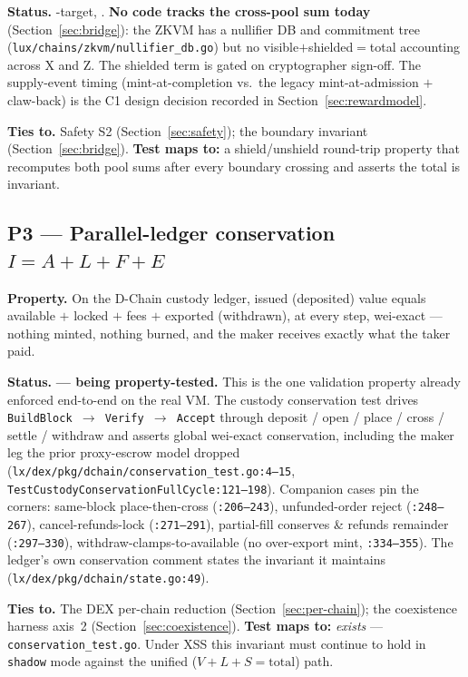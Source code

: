 \textbf{Status.} \DESIGN{}-target, \CRYPTO{}. \textbf{No code tracks the
cross-pool sum today} (Section~\ref{sec:bridge}): the ZKVM has a
nullifier DB and commitment tree
(\texttt{lux/chains/zkvm/nullifier\_db.go}) but no
visible$+$shielded$=$total accounting across X and Z. The shielded term
is gated on cryptographer sign-off. The supply-event timing
(mint-at-completion vs.\ the legacy mint-at-admission $+$ claw-back) is
the C1 design decision recorded in Section~\ref{sec:rewardmodel}.

\textbf{Ties to.} Safety S2 (Section~\ref{sec:safety}); the boundary
invariant (Section~\ref{sec:bridge}). \textbf{Test maps to:} a
shield/unshield round-trip property that recomputes both pool sums after
every boundary crossing and asserts the total is invariant.

\subsection*{P3 --- Parallel-ledger conservation $I = A + L + F + E$}

\textbf{Property.} On the D-Chain custody ledger, issued (deposited)
value equals available $+$ locked $+$ fees $+$ exported (withdrawn), at
every step, wei-exact --- nothing minted, nothing burned, and the maker
receives exactly what the taker paid.

\textbf{Status.} \IMPL{} \textbf{--- being property-tested.} This is the
one validation property already enforced end-to-end on the real VM. The
custody conservation test drives \texttt{BuildBlock $\to$ Verify $\to$
Accept} through deposit / open / place / cross / settle / withdraw and
asserts global wei-exact conservation, including the maker leg the prior
proxy-escrow model dropped
(\texttt{lx/dex/pkg/dchain/conservation\_test.go:4--15},
\texttt{TestCustodyConservationFullCycle:121--198}). Companion cases pin
the corners: same-block place-then-cross
(\texttt{:206--243}), unfunded-order reject (\texttt{:248--267}),
cancel-refunds-lock (\texttt{:271--291}), partial-fill conserves \&
refunds remainder (\texttt{:297--330}), withdraw-clamps-to-available
(no over-export mint, \texttt{:334--355}). The ledger's own conservation
comment states the invariant it maintains
(\texttt{lx/dex/pkg/dchain/state.go:49}).

\textbf{Ties to.} The DEX per-chain reduction (Section~\ref{sec:per-chain});
the coexistence harness axis~2 (Section~\ref{sec:coexistence}).
\textbf{Test maps to:} \emph{exists} --- \texttt{conservation\_test.go}.
Under XSS this invariant must continue to hold in \texttt{shadow} mode
against the unified ($V{+}L{+}S{=}\mathrm{total}$) path.

